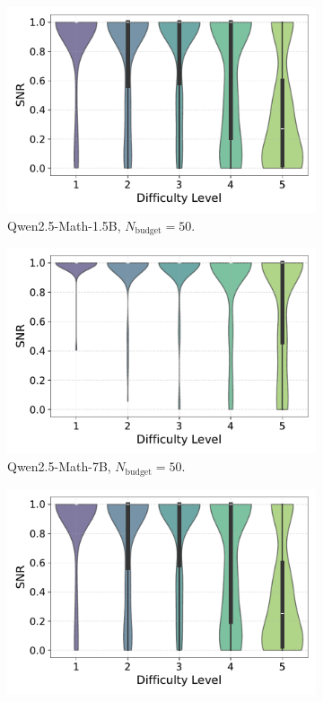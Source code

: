 \begin{figure}[h!]
\begin{subfigure}{0.49\textwidth}
      \includegraphics[width=\textwidth]{figs/QWEN-MATH-1.5B_violin_maj50_SNR_04.pdf}
        \caption{Qwen2.5-Math-1.5B, $N_{\text{budget}}=50$.}
      \label{fig:QWEN-MATH-1.5B_budget_50_SNR_04}
  \end{subfigure}
  \hfill
  \begin{subfigure}{0.49\textwidth}
      \centering
      \includegraphics[width=\textwidth]{figs/QWEN-MATH-7B_violin_maj50_SNR_04.pdf}
        \caption{Qwen2.5-Math-7B, $N_{\text{budget}}=50$.}
      \label{fig:QWEN-MATH-7B_budget_50_SNR_04}
  \end{subfigure}
  \vfill
  \begin{subfigure}{0.49\textwidth}
      \centering
      \includegraphics[width=\textwidth]{figs/QWEN-MATH-1.5B_violin_maj100_SNR_04.pdf}

\end{subfigure}
\end{figure}
